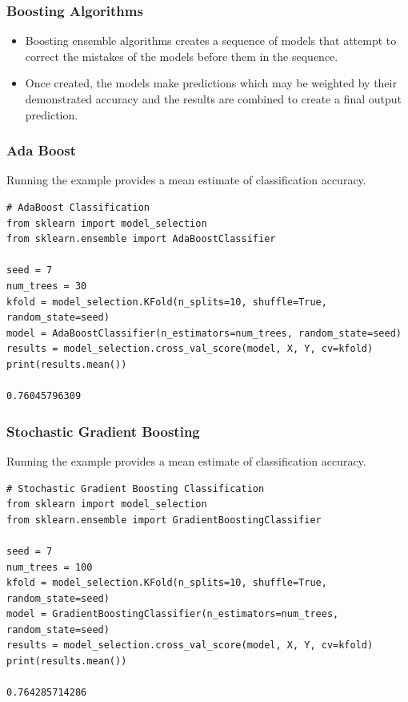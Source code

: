 \begin{frame}[fragile]\frametitle{Boosting Algorithms}

	\begin{itemize}
	\item Boosting ensemble algorithms creates a sequence of models that attempt to correct the mistakes of the models before them in the sequence.
	\item Once created, the models make predictions which may be weighted by their demonstrated accuracy and the results are combined to create a final output prediction.
	\end{itemize}
	
\end{frame}


\begin{frame}[fragile]\frametitle{Ada Boost}
Running the example provides a mean estimate of classification accuracy.

\begin{lstlisting}
# AdaBoost Classification
from sklearn import model_selection
from sklearn.ensemble import AdaBoostClassifier

seed = 7
num_trees = 30
kfold = model_selection.KFold(n_splits=10, shuffle=True, random_state=seed)
model = AdaBoostClassifier(n_estimators=num_trees, random_state=seed)
results = model_selection.cross_val_score(model, X, Y, cv=kfold)
print(results.mean())

0.76045796309
\end{lstlisting}
\end{frame}



\begin{frame}[fragile]\frametitle{Stochastic Gradient Boosting}
Running the example provides a mean estimate of classification accuracy.

\begin{lstlisting}
# Stochastic Gradient Boosting Classification
from sklearn import model_selection
from sklearn.ensemble import GradientBoostingClassifier

seed = 7
num_trees = 100
kfold = model_selection.KFold(n_splits=10, shuffle=True, random_state=seed)
model = GradientBoostingClassifier(n_estimators=num_trees, random_state=seed)
results = model_selection.cross_val_score(model, X, Y, cv=kfold)
print(results.mean())

0.764285714286
\end{lstlisting}
\end{frame}

